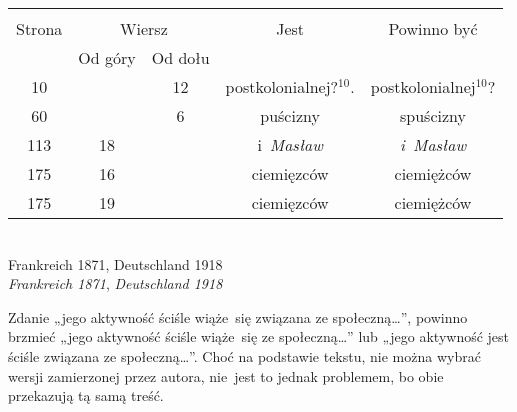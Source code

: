 \documentclass[a4paper,11pt]{article}
\begin{document}
\begin{center}

  \begin{tabular}{|c|c|c|c|c|}
    \hline
    & \multicolumn{2}{c|}{} & & \\
    Strona & \multicolumn{2}{c|}{Wiersz} & Jest
                              & Powinno być \\ \cline{2-3}
    & Od góry & Od dołu & & \\
    \hline
    10  & & 12 & postkolonialnej?$^{ 10 }$. & postkolonialnej$^{ 10 }$? \\
    60  & &  6 & puścizny & spuścizny \\
    113 & 18 & & i~\emph{Masław} & \emph{i~Masław} \\
    175 & 16 & & ciemięzców & ciemiężców \\
    175 & 19 & & ciemięzców & ciemiężców \\
    \hline
  \end{tabular}

\end{center}


\noindent
{} \\
\Jest  Frankreich 1871, Deutschland 1918 \\
\Powin \textit{Frankreich 1871}, \textit{Deutschland 1918} \\


\vspace{\spaceTwo}














\start {} Zdanie „jego aktywność ściśle wiąże~się
związana ze społeczną\ldots”, powinno brzmieć „jego aktywność ściśle
wiąże~się ze społeczną\ldots” lub „jego aktywność jest ściśle
związana ze społeczną\ldots”. Choć na podstawie tekstu, nie można
wybrać wersji zamierzonej przez autora, nie~jest to jednak problemem,
bo obie przekazują tą samą treść.
\end{document}
